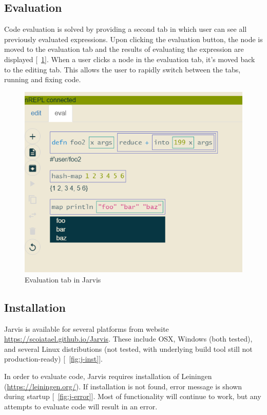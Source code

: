 \documentclass[11pt]{scrartcl}
\newcommand*{\figref}[1]{[\textbf{\figurename}~\ref{#1}]}
\begin{document}
\subsection{Evaluation}
Code evaluation is solved by providing a second tab in which user can see all
previously evaluated expressions.
Upon clicking the evaluation button, the node is moved to the evaluation tab and
the results of evaluating the expression are displayed \figref{fig:j-eval}.
When a user clicks a node in the evaluation tab, it’s moved back to the editing
tab.
This allows the user to rapidly switch between the tabs, running and fixing
code.


\begin{figure}[hbt]
  \centering
  \includegraphics[scale=0.3]{img/j-eval_f}
  \caption{Evaluation tab in Jarvis}
\label{fig:j-eval}
\end{figure}

\subsection{Installation}
Jarvis is available for several platforms from website
\url{https://scoiatael.github.io/Jarvis}. These include OSX, Windows (both
tested), and several Linux distributions (not tested, with underlying build tool
still not production-ready) \figref{fig:j-inst}.

In order to evaluate code, Jarvis requires installation of Leiningen
(\url{https://leiningen.org/}).
If installation is not found, error message is shown during startup
\figref{fig:j-error}. Most of functionality will continue to work, but any attempts
to evaluate code will result in an error.
\end{document}
